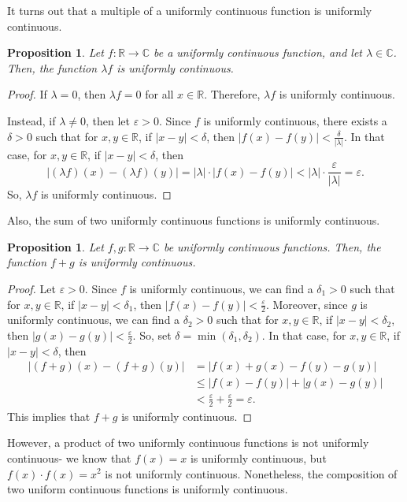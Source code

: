 \documentclass[a4paper, openany]{memoir}
\theoremstyle{definition}
\theoremstyle{plain}
\newtheorem{proposition}[definition]{Proposition}
\begin{document}
\noindent It turns out that a multiple of a uniformly continuous function is uniformly continuous.
\begin{proposition}
Let $f: \mathbb{R} \to \mathbb{C}$ be a uniformly continuous function, and let $\lambda \in \mathbb{C}$. Then, the function $\lambda f$ is uniformly continuous.
\end{proposition}
\begin{proof}
If $\lambda = 0$, then $\lambda f = 0$ for all $x \in \mathbb{R}$. Therefore, $\lambda f$ is uniformly continuous.

\noindent Instead, if $\lambda \neq 0$, then let $\varepsilon > 0$. Since $f$ is uniformly continuous, there exists a $\delta > 0$ such that for $x, y \in \mathbb{R}$, if $|x - y| < \delta$, then $|f(x) - f(y)| < \frac{\delta}{|\lambda|}$. In that case, for $x, y \in \mathbb{R}$, if $|x - y| < \delta$, then
\[|(\lambda f)(x) - (\lambda f)(y)| = |\lambda| \cdot |f(x) - f(y)| < |\lambda| \cdot \frac{\varepsilon}{|\lambda|} = \varepsilon.\]
So, $\lambda f$ is uniformly continuous.
\end{proof}
\noindent Also, the sum of two uniformly continuous functions is uniformly continuous.
\begin{proposition}
Let $f, g: \mathbb{R} \to \mathbb{C}$ be uniformly continuous functions. Then, the function $f + g$ is uniformly continuous.
\end{proposition}
\begin{proof}
Let $\varepsilon > 0$. Since $f$ is uniformly continuous, we can find a $\delta_1 > 0$ such that for $x, y \in \mathbb{R}$, if $|x - y| < \delta_1$, then $|f(x) - f(y)| < \frac{\varepsilon}{2}$. Moreover, since $g$ is uniformly continuous, we can find a $\delta_2 > 0$ such that for $x, y \in \mathbb{R}$, if $|x - y| < \delta_2$, then $|g(x) - g(y)| < \frac{\varepsilon}{2}$. So, set $\delta = \min(\delta_1, \delta_2)$. In that case, for $x, y \in \mathbb{R}$, if $|x - y| < \delta$, then 
\begin{align*}
    |(f + g)(x) - (f + g)(y)| &= |f(x) + g(x) - f(y) - g(y)| \\
    &\leqslant |f(x) - f(y)| + |g(x) - g(y)| \\
    &< \frac{\varepsilon}{2} + \frac{\varepsilon}{2} = \varepsilon.
\end{align*}
This implies that $f + g$ is uniformly continuous.
\end{proof}
\noindent However, a product of two uniformly continuous functions is not uniformly continuous- we know that $f(x) = x$ is uniformly continuous, but $f(x) \cdot f(x) = x^2$ is not uniformly continuous. Nonetheless, the composition of two uniform continuous functions is uniformly continuous.
\end{document}
